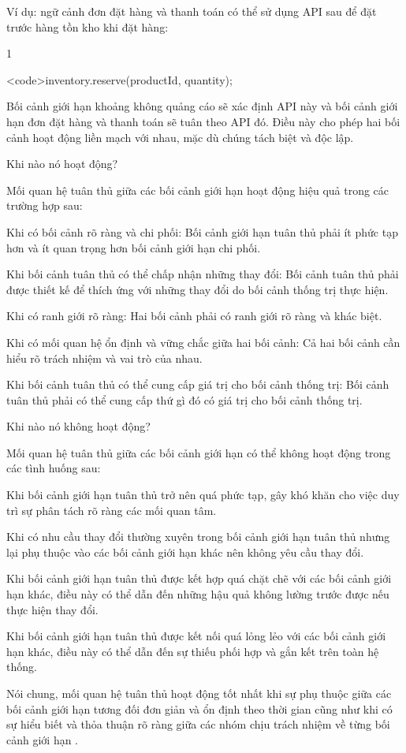Ví dụ: ngữ cảnh đơn đặt hàng và thanh toán có thể sử dụng API sau để đặt trước hàng tồn kho khi đặt hàng:

1

<code>inventory.reserve(productId, quantity);

Bối cảnh giới hạn khoảng không quảng cáo sẽ xác định API này và bối cảnh giới hạn đơn đặt hàng và thanh toán sẽ tuân theo API đó. Điều này cho phép hai bối cảnh hoạt động liền mạch với nhau, mặc dù chúng tách biệt và độc lập.

Khi nào nó hoạt động?

Mối quan hệ tuân thủ giữa các bối cảnh giới hạn hoạt động hiệu quả trong các trường hợp sau:

Khi có bối cảnh rõ ràng và chi phối: Bối cảnh giới hạn tuân thủ phải ít phức tạp hơn và ít quan trọng hơn bối cảnh giới hạn chi phối.

Khi bối cảnh tuân thủ có thể chấp nhận những thay đổi: Bối cảnh tuân thủ phải được thiết kế để thích ứng với những thay đổi do bối cảnh thống trị thực hiện.

Khi có ranh giới rõ ràng: Hai bối cảnh phải có ranh giới rõ ràng và khác biệt.

Khi có mối quan hệ ổn định và vững chắc giữa hai bối cảnh: Cả hai bối cảnh cần hiểu rõ trách nhiệm và vai trò của nhau.

Khi bối cảnh tuân thủ có thể cung cấp giá trị cho bối cảnh thống trị: Bối cảnh tuân thủ phải có thể cung cấp thứ gì đó có giá trị cho bối cảnh thống trị.

Khi nào nó không hoạt động?

Mối quan hệ tuân thủ giữa các bối cảnh giới hạn có thể không hoạt động trong các tình huống sau:

Khi bối cảnh giới hạn tuân thủ trở nên quá phức tạp, gây khó khăn cho việc duy trì sự phân tách rõ ràng các mối quan tâm.

Khi có nhu cầu thay đổi thường xuyên trong bối cảnh giới hạn tuân thủ nhưng lại phụ thuộc vào các bối cảnh giới hạn khác nên không yêu cầu thay đổi.

Khi bối cảnh giới hạn tuân thủ được kết hợp quá chặt chẽ với các bối cảnh giới hạn khác, điều này có thể dẫn đến những hậu quả không lường trước được nếu thực hiện thay đổi.

Khi bối cảnh giới hạn tuân thủ được kết nối quá lỏng lẻo với các bối cảnh giới hạn khác, điều này có thể dẫn đến sự thiếu phối hợp và gắn kết trên toàn hệ thống.

Nói chung, mối quan hệ tuân thủ hoạt động tốt nhất khi sự phụ thuộc giữa các bối cảnh giới hạn tương đối đơn giản và ổn định theo thời gian cũng như khi có sự hiểu biết và thỏa thuận rõ ràng giữa các nhóm chịu trách nhiệm về từng bối cảnh giới hạn .

